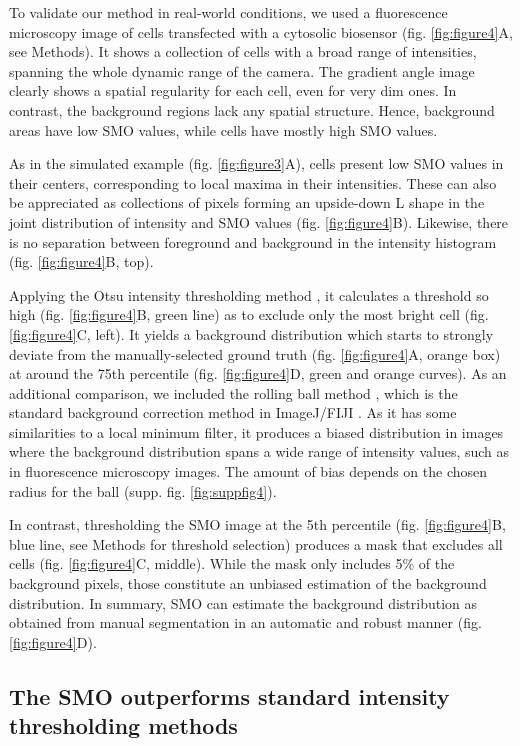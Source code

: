 \documentclass[article]{jss}
\begin{document}
	To validate our method in real-world conditions, we used a fluorescence microscopy image of cells transfected with a cytosolic biosensor (fig. \ref{fig:figure4}A, see Methods). It shows a collection of cells with a broad range of intensities, spanning the whole dynamic range of the camera. The gradient angle image clearly shows a spatial regularity for each cell, even for very dim ones. In contrast, the background regions lack any spatial structure. Hence, background areas have low SMO values, while cells have mostly high SMO values.

	As in the simulated example (fig. \ref{fig:figure3}A), cells present low SMO values in their centers, corresponding to local maxima in their intensities. These can also be appreciated as collections of pixels forming an upside-down L shape in the joint distribution of intensity and SMO values (fig. \ref{fig:figure4}B). Likewise, there is no separation between foreground and background in the intensity histogram (fig. \ref{fig:figure4}B, top).

	Applying the Otsu intensity thresholding method \citep{Otsu1979}, it calculates a threshold so high (fig. \ref{fig:figure4}B, green line) as to exclude only the most bright cell (fig. \ref{fig:figure4}C, left). It yields a background distribution which starts to strongly deviate from the manually-selected ground truth (fig. \ref{fig:figure4}A, orange box) at around the 75th percentile (fig. \ref{fig:figure4}D, green and orange curves). As an additional comparison, we included the rolling ball method \citep{Sternberg1983}, which is the standard background correction method in ImageJ/FIJI \citep{Schindelin2012}. As it has some similarities to a local minimum filter, it produces a biased distribution in images where the background distribution spans a wide range of intensity values, such as in fluorescence microscopy images. The amount of bias depends on the chosen radius for the ball (supp. fig. \ref{fig:suppfig4}).

	In contrast, thresholding the SMO image at the 5th percentile (fig. \ref{fig:figure4}B, blue line, see Methods for threshold selection) produces a mask that excludes all cells (fig. \ref{fig:figure4}C, middle). While the mask only includes 5\% of the background pixels, those constitute an unbiased estimation of the background distribution. In summary, SMO can estimate the background distribution as obtained from manual segmentation in an automatic and robust manner (fig. \ref{fig:figure4}D).

\subsection{The SMO outperforms standard intensity thresholding methods}
\end{document}
